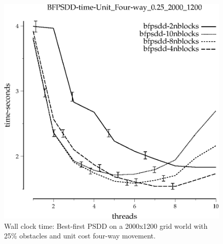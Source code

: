 \documentclass{article}
\begin{document}
\begin{appendices}
\begin{figure}[h]
\begin{center}
\includegraphics{../graphs/grid_unit_four-way_0.25_2000_1200/BFPSDD-time-Unit_Four-way_0.25_2000_1200.eps}
\caption{Wall clock time: Best-first PSDD on a 2000x1200 grid world with 25\%
  obstacles and unit cost four-way movement.}
\end{center}
\end{figure}


\end{appendices}
\end{document}

